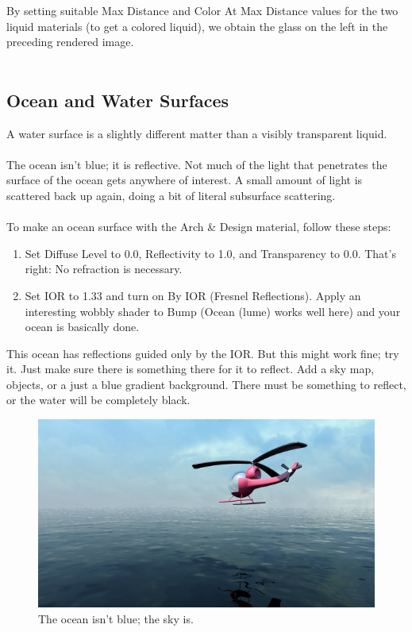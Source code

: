 \documentclass[10pt,a4paper]{article}
\begin{document}
By setting suitable Max Distance and Color At Max Distance values for the two liquid materials (to get a colored liquid), we obtain the glass on the left in the preceding rendered image.
\\
\\
\subsection{Ocean and Water Surfaces}
A water surface is a slightly different matter than a visibly transparent liquid.
\\
\\
The ocean isn’t blue; it is reflective. Not much of the light that penetrates the surface of the ocean gets anywhere of interest. A small amount of light is scattered back up again, doing a bit of literal subsurface scattering.
\\
\\
To make an ocean surface with the Arch \& Design material, follow these steps:

\begin{enumerate}
	\item Set Diffuse Level to 0.0, Reflectivity to 1.0, and Transparency to 0.0. That's right: No refraction is necessary.
	\item Set IOR to 1.33 and turn on By IOR (Fresnel Reflections). Apply an interesting wobbly shader to Bump (Ocean (lume) works well here) and your ocean is basically done.
\end{enumerate}

This ocean has reflections guided only by the IOR. But this might work fine; try it. Just make sure there is something there for it to reflect. Add a sky map, objects, or a just a blue gradient background. There must be something to reflect, or the water will be completely black.

\begin{figure}[tbh]
	\centering
	\includegraphics[width=0.5\linewidth]{figure/blue_ocean}
	\caption{The ocean isn’t blue; the sky is.}
	\label{fig:the-ocean-isnt-blue-the-sky-is}
\end{figure}
\end{document}
